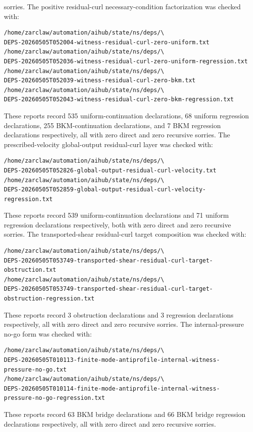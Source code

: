 \documentclass[11pt]{article}
\begin{document}
sorries.
The positive residual-curl necessary-condition factorization was checked with:
\begin{verbatim}
/home/zarclaw/automation/aihub/state/ns/deps/\
DEPS-20260505T052004-witness-residual-curl-zero-uniform.txt
/home/zarclaw/automation/aihub/state/ns/deps/\
DEPS-20260505T052036-witness-residual-curl-zero-uniform-regression.txt
/home/zarclaw/automation/aihub/state/ns/deps/\
DEPS-20260505T052039-witness-residual-curl-zero-bkm.txt
/home/zarclaw/automation/aihub/state/ns/deps/\
DEPS-20260505T052043-witness-residual-curl-zero-bkm-regression.txt
\end{verbatim}
These reports record 535 uniform-continuation declarations, 68 uniform
regression declarations, 255 BKM-continuation declarations, and 7 BKM
regression declarations respectively, all with zero direct and zero recursive
sorries.
The prescribed-velocity global-output residual-curl layer was checked with:
\begin{verbatim}
/home/zarclaw/automation/aihub/state/ns/deps/\
DEPS-20260505T052826-global-output-residual-curl-velocity.txt
/home/zarclaw/automation/aihub/state/ns/deps/\
DEPS-20260505T052859-global-output-residual-curl-velocity-regression.txt
\end{verbatim}
These reports record 539 uniform-continuation declarations and 71 uniform
regression declarations respectively, both with zero direct and zero recursive
sorries.
The transported-shear residual-curl target composition was checked with:
\begin{verbatim}
/home/zarclaw/automation/aihub/state/ns/deps/\
DEPS-20260505T053749-transported-shear-residual-curl-target-obstruction.txt
/home/zarclaw/automation/aihub/state/ns/deps/\
DEPS-20260505T053749-transported-shear-residual-curl-target-obstruction-regression.txt
\end{verbatim}
These reports record 3 obstruction declarations and 3 regression declarations
respectively, all with zero direct and zero recursive sorries.
The internal-pressure no-go form was checked with:
\begin{verbatim}
/home/zarclaw/automation/aihub/state/ns/deps/\
DEPS-20260505T010113-finite-mode-antiprofile-internal-witness-pressure-no-go.txt
/home/zarclaw/automation/aihub/state/ns/deps/\
DEPS-20260505T010114-finite-mode-antiprofile-internal-witness-pressure-no-go-regression.txt
\end{verbatim}
These reports record 63 BKM bridge declarations and 66 BKM bridge regression
declarations respectively, all with zero direct and zero recursive sorries.
\end{document}
